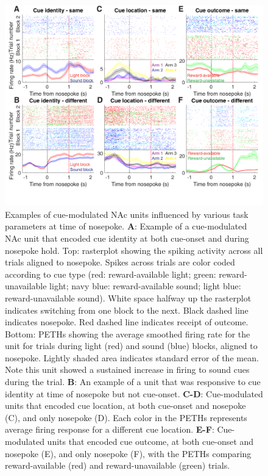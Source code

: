 \documentclass[11pt]{article}
\newcommand{\bsf}[1]{\textbf{#1}}
\providecommand{\DIFaddbeginFL}{} %
\providecommand{\DIFaddendFL}{} %
\providecommand{\DIFdelbeginFL}{} %
\providecommand{\DIFdelendFL}{} %
\newcommand{\DIFscaledelfig}{0.5}
\newlength{\DIFdelgraphicswidth} %
\newlength{\DIFdelgraphicsheight} %
\newcommand{\DIFaddincludegraphics}[2][]{{\color{blue}\fbox{\DIFOincludegraphics[#1]{#2}}}} %
\newcommand{\DIFdelincludegraphics}[2][]{%
\sbox{\DIFdelgraphicsbox}{\DIFOincludegraphics[#1]{#2}}%
\settoboxwidth{\DIFdelgraphicswidth}{\DIFdelgraphicsbox} %
\settoboxtotalheight{\DIFdelgraphicsheight}{\DIFdelgraphicsbox} %
\scalebox{\DIFscaledelfig}{%
\parbox[b]{\DIFdelgraphicswidth}{\usebox{\DIFdelgraphicsbox}\\[-\baselineskip] \rule{\DIFdelgraphicswidth}{0em}}\llap{\resizebox{\DIFdelgraphicswidth}{\DIFdelgraphicsheight}{%
\setlength{\unitlength}{\DIFdelgraphicswidth}%
\begin{picture}(1,1)%
\thicklines\linethickness{2pt} %
{\color[rgb]{1,0,0}\put(0,0){\framebox(1,1){}}}%
{\color[rgb]{1,0,0}\put(0,0){\line( 1,1){1}}}%
{\color[rgb]{1,0,0}\put(0,1){\line(1,-1){1}}}%
\end{picture}%
}\hspace*{3pt}}} %
} %
\DeclareRobustCommand{\DIFaddbeginFL}{\DIFOaddbeginFL \let\includegraphics\DIFaddincludegraphics} %
\DeclareRobustCommand{\DIFaddendFL}{\DIFOaddendFL \let\includegraphics\DIFOincludegraphics} %
\DeclareRobustCommand{\DIFdelbeginFL}{\DIFOdelbeginFL \let\includegraphics\DIFdelincludegraphics} %
\DeclareRobustCommand{\DIFdelendFL}{\DIFOaddendFL \let\includegraphics\DIFOincludegraphics} %
\begin{document}
 \begin{figure}[ht!]
\centering
\DIFdelbeginFL %
\DIFdelendFL \DIFaddbeginFL \includegraphics[width=\textwidth]{Fig 8 - NP Neural examples.pdf}
\DIFaddendFL \caption{Examples of cue-modulated NAc units influenced by various task
parameters at time of nosepoke. \bsf{A}: Example of a cue-modulated NAc unit
that encoded cue identity at both cue-onset and during nosepoke hold. Top:
rasterplot showing the spiking activity across all trials aligned to
nosepoke. Spikes across trials are color coded according to cue type (red:
reward-available light; green: reward-unavailable light; navy blue:
reward-available sound; light blue: reward-unavailable sound). White space
halfway up the rasterplot indicates switching from one block to the
next. Black dashed line indicates nosepoke. Red dashed line indicates receipt
of outcome. Bottom: PETHs showing the average smoothed firing rate for the
unit for trials during light (red) and sound (blue) blocks, aligned to
nosepoke. Lightly shaded area indicates standard error of the mean. Note this
unit showed a sustained increase in firing to sound cues during the trial. \bsf{B}: An
example of a unit that was responsive to cue identity at time of nosepoke but
not cue-onset. \bsf{C-D}: Cue-modulated units that encoded cue location, at
both cue-onset and nosepoke (C), and only nosepoke (D). Each color in the
PETHs represents average firing response for a different cue
location. \bsf{E-F}: Cue-modulated units that encoded cue outcome, at both
cue-onset and nosepoke (E), and only nosepoke (F), with the PETHs comparing
reward-available (red) and reward-unavailable (green) trials.}
\label{fig:NP_examples}
\end{figure} \clearpage
\end{document}
